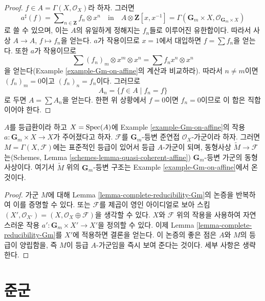 \begin{proof}
$f \in A = \Gamma(X, \mathcal{O}_X)$라 하자. 그러면
$$
a^\sharp(f) = \sum\nolimits_{n \in \mathbf{Z}} f_n \otimes x^n
\quad\text{in}\quad
A \otimes \mathbf{Z}[x, x^{-1}] =
\Gamma(\mathbf{G}_m \times X, \mathcal{O}_{\mathbf{G}_m \times X})
$$
로 쓸 수 있으며, 이는 $A$의 유일하게 정해지는 $f_n$들로 이루어진 유한합이다. 따라서 사상
$A \to A$, $f \mapsto f_n$을 얻는다. $a$가 작용이므로 $x = 1$에서 대입하면 $f = \sum f_n$을 얻는다.
또한 $a$가 작용이므로
$$
\sum (f_n)_m \otimes x^m \otimes x^n = \sum f_n x^n \otimes x^n
$$
을 얻는다(Example \ref{example-Gm-on-affine}의 계산과 비교하라). 따라서 $n \not = m$이면 $(f_n)_m = 0$이고
$(f_n)_n = f_n$이다. 그러므로
$$
A_n = \{f \in A \mid f_n = f\}
$$
로 두면 $A = \sum A_n$을 얻는다. 한편 위 상황에서 $f = 0$이면 $f_n = 0$이므로 이 합은 직합이어야 한다.
\end{proof}

\begin{lemma}
\label{lemma-Gm-equivariant-module}
$A$를 등급환이라 하고 $X = \mathop{\mathrm{Spec}}(A)$에 Example \ref{example-Gm-on-affine}의 작용
$a : \mathbf{G}_m \times X \to X$가 주어졌다고 하자. $\mathcal{F}$를 $\mathbf{G}_m$-등변 준연접
$\mathcal{O}_X$-가군이라 하자. 그러면 $M = \Gamma(X, \mathcal{F})$에는 표준적인 등급이 있어서 등급 $A$-가군이 되며,
동형사상 $\widetilde{M} \to \mathcal{F}$는(Schemes, Lemma \ref{schemes-lemma-quasi-coherent-affine})
$\mathbf{G}_m$-등변 가군의 동형사상이다. 여기서 $\widetilde{M}$ 위의 $\mathbf{G}_m$-등변 구조는
Example \ref{example-Gm-on-affine}에서 온 것이다.
\end{lemma}

\begin{proof}
가군 $M$에 대해 Lemma \ref{lemma-complete-reducibility-Gm}의 논증을 반복하여 이를 증명할 수 있다.
또는 $\mathcal{F}$를 제곱이 영인 아이디얼로 보아 스킴
$(X', \mathcal{O}_{X'}) = (X, \mathcal{O}_X \oplus \mathcal{F})$을 생각할 수 있다. $X$와 $\mathcal{F}$ 위의 작용을 사용하여
자연스러운 작용 $a' : \mathbf{G}_m \times X' \to X'$을 정의할 수 있다. 이제 Lemma
\ref{lemma-complete-reducibility-Gm}를 $X'$에 적용하면 결론을 얻는다. 이 논증의 좋은 점은 $A$와 $M$의 등급이 양립함을,
즉 $M$이 등급 $A$-가군임을 즉시 보여 준다는 것이다. 세부 사항은 생략한다.
\end{proof}



\section{준군}
\label{section-groupoids}

